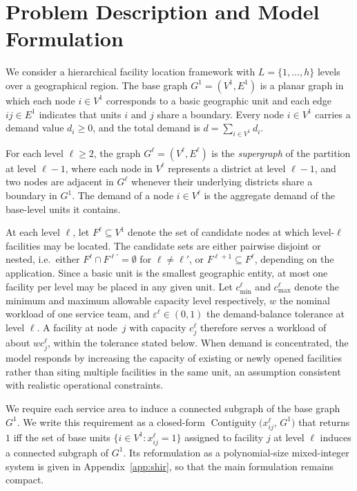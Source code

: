 \documentclass[preprint,12pt,authoryear]{elsarticle}
\theoremstyle{definition}
\DeclareMathOperator{\Contiguity}{Contiguity}  %
\begin{document}
\section{Problem Description and Model Formulation}
\label{sec:model}

We consider a hierarchical facility location framework with $L = \{1, \ldots, h\}$
levels over a geographical region. The base graph $G^1 = (V^1, E^1)$ is a planar
graph in which each node $i \in V^1$ corresponds to a basic geographic unit and
each edge $ij \in E^1$ indicates that units $i$ and $j$ share a boundary.
Every node $i \in V^1$ carries a demand value $d_i \geq 0$, and the total demand
is $d = \sum_{i \in V^1} d_i$.

For each level $\ell \geq 2$, the graph $G^\ell = (V^\ell, E^\ell)$ is the
\textit{supergraph} of the partition at level $\ell - 1$, where each node in $V^\ell$
represents a district at level $\ell - 1$, and two nodes are adjacent in $G^\ell$
whenever their underlying districts share a boundary in $G^1$. The demand of a node
$i \in V^\ell$ is the aggregate demand of the base-level units it contains.

At each level $\ell$, let $F^\ell \subseteq V^1$ denote the set of candidate
nodes at which level-$\ell$ facilities may be located. The candidate sets are either pairwise disjoint or nested, i.e.\ either $F^{\ell} \cap F^{\ell'} = \emptyset$ for $\ell \neq \ell'$, or $F^{\ell+1} \subseteq F^{\ell}$, depending on the application. Since a basic unit is the smallest geographic
entity, at most one facility per level may be placed in any given unit.
Let $c^\ell_{\min}$ and $c^{\ell}_{\max}$ denote the minimum and maximum allowable
capacity level respectively, $w$ the nominal workload of one service team, and
$\varepsilon^{\ell} \in (0,1)$ the demand-balance tolerance at level $\ell$. A facility at node~$j$ with capacity $c^{\ell}_j$ therefore serves a workload of about $w c^{\ell}_j$, within the tolerance stated below. When
demand is concentrated, the model responds by increasing the capacity of existing
or newly opened facilities rather than siting multiple facilities in the same
unit, an assumption consistent with realistic operational constraints.

We require each service area to induce a connected subgraph of the 
base graph $G^1$. We write this requirement as a closed-form 
$\Contiguity\!\bigl(x^{\ell}_{ij},\, G^1\bigr)$ that returns $1$ 
iff the set of base units $\{i \in V^1 : x^{\ell}_{ij} =1\}$ assigned 
to facility $j$ at level $\ell$ induces a connected subgraph of $G^1$. 
Its reformulation as a polynomial-size mixed-integer system is given in 
Appendix~\ref{app:shir}, so that the main formulation remains compact.
\end{document}
